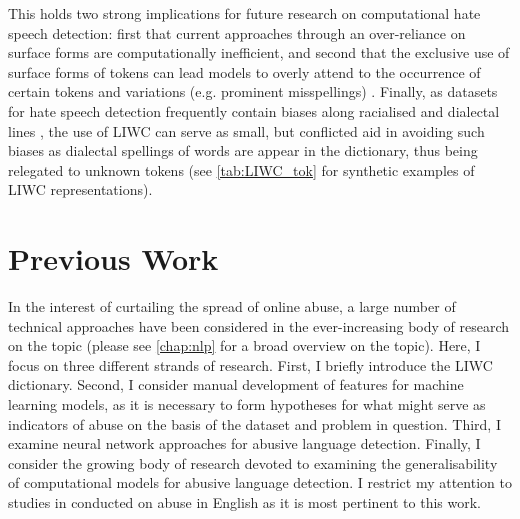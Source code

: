 This holds two strong implications for future research on computational hate speech detection: first that current approaches through an over-reliance on surface forms are computationally inefficient, and second that the exclusive use of surface forms of tokens can lead models to overly attend to the occurrence of certain tokens and variations (e.g. prominent misspellings) \citep{Rottger:2021}.
Finally, as datasets for hate speech detection frequently contain biases along racialised and dialectal lines \citep{Waseem:2018,Davidson:2019}, the use of LIWC can serve as small, but conflicted aid in avoiding such biases as dialectal spellings of words are  appear in the dictionary, thus being relegated to unknown tokens (see \cref{tab:LIWC_tok} for synthetic examples of LIWC representations).

\section{Previous Work}
In the interest of curtailing the spread of online abuse, a large number of technical approaches have been considered in the ever-increasing body of research on the topic (please see \cref{chap:nlp} for a broad overview on the topic).
Here, I focus on three different strands of research.
First, I briefly introduce the LIWC dictionary. 
Second, I consider manual development of features for machine learning models, as it is necessary to form hypotheses for what might serve as indicators of abuse on the basis of the dataset and problem in question.
Third, I examine neural network approaches for abusive language detection.
Finally, I consider the growing body of research devoted to examining the generalisability of computational models for abusive language detection.
I restrict my attention to studies in conducted on abuse in English as it is most pertinent to this work.

